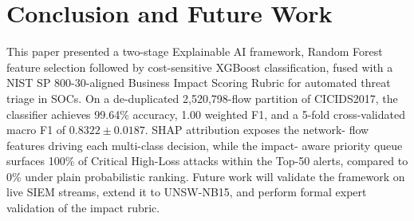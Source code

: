 \documentclass[conference]{IEEEtran}
\begin{document}
\section{Conclusion and Future Work}
This paper presented a two-stage Explainable AI framework, Random 
Forest feature selection followed by cost-sensitive XGBoost 
classification, fused with a NIST SP 800-30-aligned Business Impact 
Scoring Rubric for automated threat triage in SOCs. On a de-duplicated 
2{,}520{,}798-flow partition of CICIDS2017, the classifier achieves 
99.64\% accuracy, 1.00 weighted F1, and a 5-fold cross-validated 
macro F1 of $0.8322\pm0.0187$. SHAP attribution exposes the network-
flow features driving each multi-class decision, while the impact-
aware priority queue surfaces 100\% of Critical High-Loss attacks 
within the Top-50 alerts, compared to 0\% under plain probabilistic 
ranking. Future work will validate the framework on live SIEM 
streams, extend it to UNSW-NB15, and perform formal expert 
validation of the impact rubric.
\end{document}
